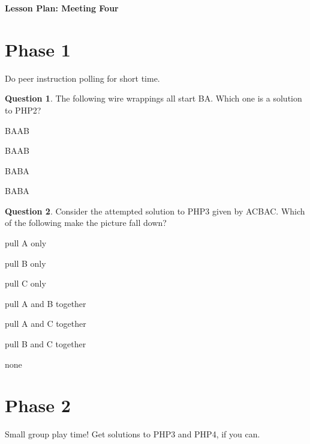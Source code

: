 \documentclass[12pt]{amsart}
\theoremstyle{definition}
\newtheorem{question}{Question}
\begin{document}
\begin{center}
\textbf{\Huge
Lesson Plan: Meeting Four
}
\end{center}
\vspace{.5in}

\section*{Phase 1}
Do peer instruction polling for short time.

\begin{question} 
The following wire wrappings all start BA\*.  
Which one is a solution to PHP2?
\begin{compactitem}
    \item BA\*AB
    \item BA\*AB\*
    \item BA\*BA
    \item BA\*B\*A
\end{compactitem}
\end{question}

\begin{question}
 Consider the attempted solution to PHP3 given by ACB\*A\*C. 
 Which of the following make the picture fall down?
\begin{compactitem}
	\item pull A only
	\item pull B only
	\item pull C only
	\item pull A and B together
	\item pull A and C together
	\item pull B and C together
	\item none
\end{compactitem}
\end{question}

\section*{Phase 2}
Small group play time! Get solutions to PHP3 and PHP4, if you can.
\end{document}
